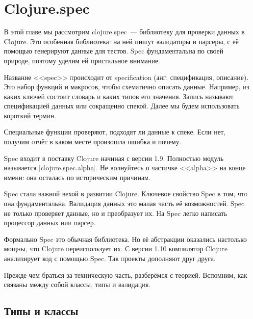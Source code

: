 \chapter{Clojure.spec}

\label{chapter-spec}


\begin{teaser}
В этой главе мы рассмотрим clojure.spec~--- библиотеку для проверки данных в
Clojure. Это особенная библиотека: на ней пишут валидаторы и парсеры, с е\"{е}
помощью генерируют данные для тестов. Spec фундаментальна по своей природе,
поэтому уделим ей пристальное внимание.
\end{teaser}

Название <<spec>> происходит от specification (анг. спецификация, описание). Это
набор функций и макросов, чтобы схематично описать данные. Например, из каких
ключей состоит словарь и каких типов его значения. Запись называют
спецификацией данных или сокращенно спекой. Далее мы будем
использовать короткий термин.

Специальные функции проверяют, подходят ли данные к спеке. Если нет, получим
отч\"{е}т в каком месте произошла ошибка и почему.


Spec входит в поставку Clojure начиная с версии 1.9. Полностью модуль называется
\spverb|clojure.spec.alpha|. Не волнуйтесь о частичке <<alpha>> на конце
имени: она осталась по историческим причинам.


Spec стала важной вехой в развитии Clojure. Ключевое свойство Spec в том, что
она фундаментальна. Валидация данных это малая часть е\"{е} возможностей. Spec не
только проверяет данные, но и преобразует их. На Spec легко написать процессор
данных или парсер.

Формально Spec это обычная библиотека. Но е\"{е} абстракции оказались настолько
мощны, что Clojure переиспользует их. С версии 1.10 компилятор Clojure
анализирует код с помощью Spec. Так проекты дополняют друг друга.

Прежде чем браться за техническую часть, разбер\"{е}мся с теорией. Вспомним, как
связаны между собой классы, типы и валидация.

\section{Типы и классы}

